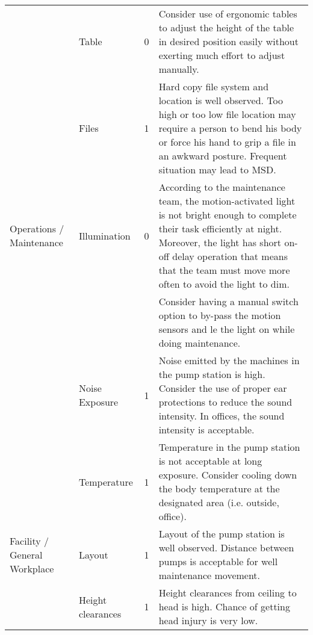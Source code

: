 \begin{table}[!h]
{\begin{tabular}{p{1.5cm}|p{1.5cm}|c|p{10cm}}
 & Table & 0 & Consider use of ergonomic tables to adjust the height of the table in desired position easily without exerting much effort to adjust manually. \\ 
 & Files & 1 & Hard copy file system and location is well observed. Too high or too low file location may require a person to bend his body or force his hand to grip a file in an awkward posture. Frequent situation may lead to MSD. \\ 
\hline
Operations / Maintenance & Illumination & 0 & According to the maintenance team, the motion-activated light is not bright enough to complete their task efficiently at night. Moreover, the light has short on-off delay operation that means that the team must move more often to avoid the light to dim.  \\ 
 &  &  & Consider having a manual switch option to by-pass the motion sensors and le the light on while doing maintenance.  \\ 
 & Noise Exposure & 1 & Noise emitted by the machines in the pump station is high. Consider the use of proper ear protections to reduce the sound intensity. In offices, the sound intensity is acceptable.  \\ 
 & Temperature & 1 & Temperature in the pump station is not acceptable at long exposure. Consider cooling down the body temperature at the designated area (i.e. outside, office). \\ 
\hline
Facility / General Workplace & Layout & 1 & Layout of the pump station is well observed. Distance between pumps is acceptable for well maintenance movement.  \\ 
 & Height clearances & 1 & Height clearances from ceiling to head is high. Chance of getting head injury is very low. \\ 
\hline
\end{tabular}

	}
\end{table}